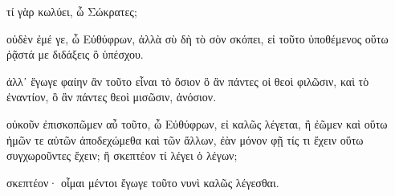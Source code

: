τί
γὰρ
κωλύει,
ὦ
Σώκρατες;

οὐδὲν
ἐμέ
γε,
ὦ
Εὐθύφρων,
ἀλλὰ
σὺ
δὴ
τὸ
σὸν
σκόπει,
εἰ
τοῦτο
ὑποθέμενος
οὕτω
ῥᾷστά
με
διδάξεις
ὃ
ὑπέσχου.

\versification{[9e]}
ἀλλ᾽
ἔγωγε
φαίην
ἂν
τοῦτο
εἶναι
τὸ
ὅσιον
ὃ
ἂν
πάντες
οἱ
θεοὶ
φιλῶσιν,
καὶ
τὸ
ἐναντίον,
ὃ
ἂν
πάντες
θεοὶ
μισῶσιν,
ἀνόσιον.

οὐκοῦν
ἐπισκοπῶμεν
αὖ
τοῦτο,
ὦ
Εὐθύφρων,
εἰ
καλῶς
λέγεται,
ἢ
ἐῶμεν
καὶ
οὕτω
ἡμῶν
τε
αὐτῶν
ἀποδεχώμεθα
καὶ
τῶν
ἄλλων,
ἐὰν
μόνον
φῇ
τίς
τι
ἔχειν
οὕτω
συγχωροῦντες
ἔχειν;
ἢ
σκεπτέον
τί
λέγει
ὁ
λέγων;

σκεπτέον·
οἶμαι
μέντοι
ἔγωγε
τοῦτο
νυνὶ
καλῶς
λέγεσθαι.
